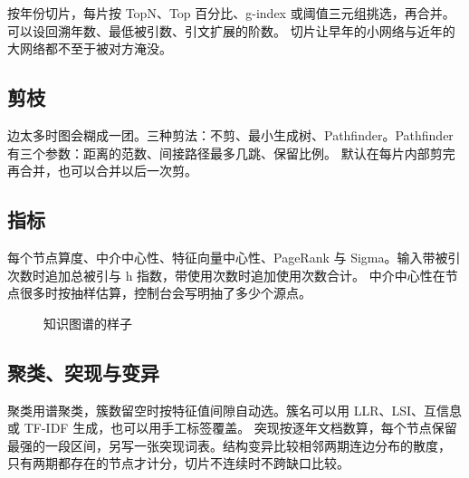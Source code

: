 按年份切片，每片按 TopN、Top 百分比、g-index 或阈值三元组挑选，再合并。可以设回溯年数、最低被引数、引文扩展的阶数。
切片让早年的小网络与近年的大网络都不至于被对方淹没。

\subsection{剪枝}

边太多时图会糊成一团。三种剪法：不剪、最小生成树、Pathfinder。Pathfinder 有三个参数：距离的范数、间接路径最多几跳、保留比例。
默认在每片内部剪完再合并，也可以合并以后一次剪。

\subsection{指标}

每个节点算度、中介中心性、特征向量中心性、PageRank 与 Sigma。输入带被引次数时追加总被引与 h 指数，带使用次数时追加使用次数合计。
中介中心性在节点很多时按抽样估算，控制台会写明抽了多少个源点。

\begin{figure}[H]\centering
{}
\caption{知识图谱的样子}
\label{fig:kg}
\end{figure}

\subsection{聚类、突现与变异}

聚类用谱聚类，簇数留空时按特征值间隙自动选。簇名可以用 LLR、LSI、互信息或 TF-IDF 生成，也可以用手工标签覆盖。
突现按逐年文档数算，每个节点保留最强的一段区间，另写一张突现词表。结构变异比较相邻两期连边分布的散度，
只有两期都存在的节点才计分，切片不连续时不跨缺口比较。


